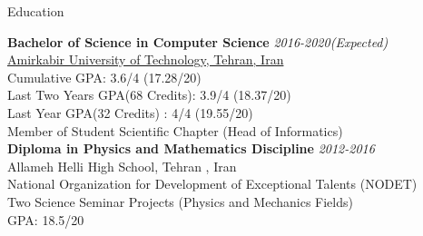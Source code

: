 \documentclass{resume} %
\begin{document}
	
	
	\begin{rSection}{Education}
		
		{\bf Bachelor of Science in Computer Science} \hfill {\em 2016-2020(Expected)} \\ 
		\href{https://www.topuniversities.com/universities/amirkabir-university-technology}{Amirkabir University of Technology, Tehran, Iran}\\
		Cumulative GPA: 3.6/4 (17.28/20)\\
		Last Two Years GPA(68 Credits): 3.9/4 (18.37/20)\\
		Last Year GPA(32 Credits) : 4/4 (19.55/20)\\
		Member of Student Scientific Chapter (Head of Informatics) \\
		
		{\bf Diploma in Physics and Mathematics Discipline} \hfill {\em 2012-2016}\\ 
		Allameh Helli High School, Tehran , Iran\\
		National Organization for Development of Exceptional Talents (NODET)\\
		Two Science Seminar Projects (Physics and Mechanics Fields)\\
		GPA: 18.5/20\\
		
	\end{rSection}
	
	
\end{document}
